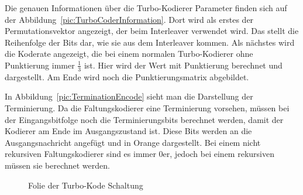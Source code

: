 Die genauen Informationen über die Turbo-Kodierer Parameter finden sich auf der Abbildung~\ref{pic:TurboCoderInformation}. Dort wird als erstes der Permutationsvektor angezeigt, der beim Interleaver verwendet wird. Das stellt die Reihenfolge der Bits dar, wie sie aus dem Interleaver kommen. Als nächstes wird die Koderate angezeigt, die bei einem normalen Turbo-Kodierer ohne Punktierung immer $\frac{1}{3}$ ist. Hier wird der Wert mit Punktierung berechnet und dargestellt. Am Ende wird noch die Punktierungsmatrix abgebildet. 

In Abbildung~\ref{pic:TerminationEncode} sieht man die Darstellung der Terminierung. Da die Faltungskodierer eine Terminierung vorsehen, müssen bei der Eingangsbitfolge noch die Terminierungsbits berechnet werden, damit der Kodierer am Ende im Ausgangszustand ist. Diese Bits werden an die Ausgangsnachricht angefügt und in Orange dargestellt. Bei einem nicht rekursiven Faltungskodierer sind es immer 0er, jedoch bei einem rekursiven müssen sie berechnet werden.

\begin{figure}[th]
\centering
{}
\caption{Folie der Turbo-Kode Schaltung}
\label{pic:TurboEncode}
\end{figure}
	
